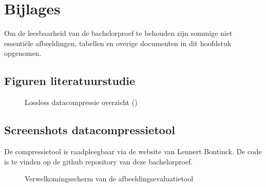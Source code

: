 \chapter{Bijlages}
\label{ch:bijlages}

Om de leesbaarheid van de bachelorproef te behouden zijn sommige niet essentiële afbeeldingen, tabellen en overige documenten in dit hoofdstuk opgenomen. 

\section{Figuren literatuurstudie}
\label{sec:bijlages-literatuurstudie}

\FloatBarrier
\begin{figure}[h!]
	\centering
	\caption{Lossless datacompressie overzicht (\cite{ethwcompressionhistory})}
	\label{fig:lossles-datacompressie-overzicht}
\end{figure}
\FloatBarrier

\section{Screenshots datacompressietool}
\label{sec:bijlages-screenshot-datacompressietool}

De \gls{compressietool} is raadpleegbaar via de website van Lennert Bontinck. De code is te vinden op de \gls{github} repository van deze bachelorproef.

\FloatBarrier
\begin{figure}[h!]
	\caption{Verwelkomingsscherm van de \gls{afbeeldingsevaluatietool}}
	\label{fig:bijlages-screenshot-datacompressietool-index}
\end{figure}
\FloatBarrier


